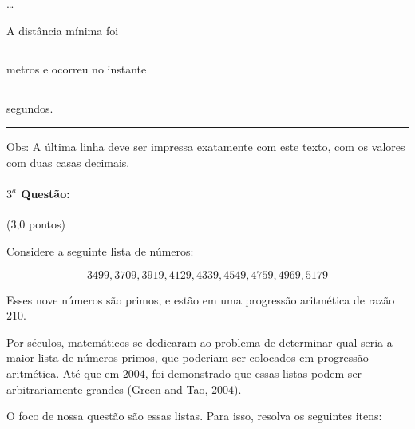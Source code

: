 \documentclass[12pt,a4paper]{article}
\begin{document}
\dots

A distância mínima foi \rule{1cm}{0.01cm} metros e ocorreu no instante \rule{1cm}{0.01cm} segundos.

\rule{12cm}{0.01cm}

Obs: A última linha deve ser impressa exatamente com este texto, com os valores com duas casas decimais.

\paragraph{$3^a$ Questão:} (3,0 pontos)

Considere a seguinte lista de números:

$$ 3499,3709,3919,4129,4339,4549,4759,4969,5179 $$

Esses nove números são primos, e estão em uma progressão aritmética de razão $210$.

Por séculos, matemáticos se dedicaram ao problema de determinar qual seria a maior lista de números primos, que poderiam ser 
colocados em progressão aritmética. Até que em $2004$, foi demonstrado que essas listas podem ser arbitrariamente grandes (Green and Tao, $2004$).

O foco de nossa questão são essas listas. Para isso, resolva os seguintes itens:
\end{document}
